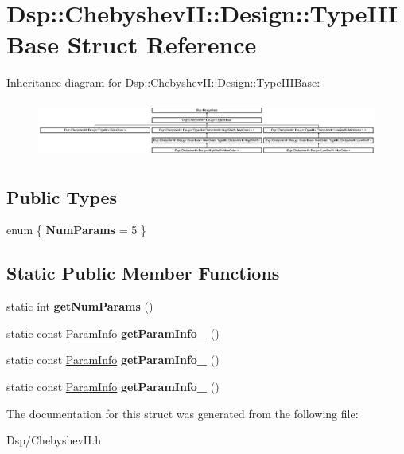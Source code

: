 \hypertarget{structDsp_1_1ChebyshevII_1_1Design_1_1TypeIIIBase}{\section{Dsp\-:\-:Chebyshev\-I\-I\-:\-:Design\-:\-:Type\-I\-I\-I\-Base Struct Reference}
\label{structDsp_1_1ChebyshevII_1_1Design_1_1TypeIIIBase}
}
Inheritance diagram for Dsp\-:\-:Chebyshev\-I\-I\-:\-:Design\-:\-:Type\-I\-I\-I\-Base\-:\begin{figure}[H]
\begin{center}
\leavevmode
\includegraphics[height=1.870407cm]{structDsp_1_1ChebyshevII_1_1Design_1_1TypeIIIBase}
\end{center}
\end{figure}
\subsection*{Public Types}
\begin{DoxyCompactItemize}
\item 
enum \{ {\bfseries Num\-Params} =  5
 \}
\end{DoxyCompactItemize}
\subsection*{Static Public Member Functions}
\begin{DoxyCompactItemize}
\item 
\hypertarget{structDsp_1_1ChebyshevII_1_1Design_1_1TypeIIIBase_ab7ccf7cf94070096268d35b91c32137d}{static int {\bfseries get\-Num\-Params} ()}\label{structDsp_1_1ChebyshevII_1_1Design_1_1TypeIIIBase_ab7ccf7cf94070096268d35b91c32137d}

\item 
\hypertarget{structDsp_1_1ChebyshevII_1_1Design_1_1TypeIIIBase_a0dbf497ae6c56bb03a66baa5397dfa09}{static const \hyperlink{classDsp_1_1ParamInfo}{Param\-Info} {\bfseries get\-Param\-Info\-\_} ()}\label{structDsp_1_1ChebyshevII_1_1Design_1_1TypeIIIBase_a0dbf497ae6c56bb03a66baa5397dfa09}

\item 
\hypertarget{structDsp_1_1ChebyshevII_1_1Design_1_1TypeIIIBase_afbecd5cbc76dc2ff58d3d878e0701cd2}{static const \hyperlink{classDsp_1_1ParamInfo}{Param\-Info} {\bfseries get\-Param\-Info\-\_} ()}\label{structDsp_1_1ChebyshevII_1_1Design_1_1TypeIIIBase_afbecd5cbc76dc2ff58d3d878e0701cd2}

\item 
\hypertarget{structDsp_1_1ChebyshevII_1_1Design_1_1TypeIIIBase_a03717b66e00a70480f314f3c13d2a14d}{static const \hyperlink{classDsp_1_1ParamInfo}{Param\-Info} {\bfseries get\-Param\-Info\-\_} ()}\label{structDsp_1_1ChebyshevII_1_1Design_1_1TypeIIIBase_a03717b66e00a70480f314f3c13d2a14d}

\end{DoxyCompactItemize}


The documentation for this struct was generated from the following file\-:\begin{DoxyCompactItemize}
\item 
Dsp/Chebyshev\-I\-I.\-h\end{DoxyCompactItemize}
